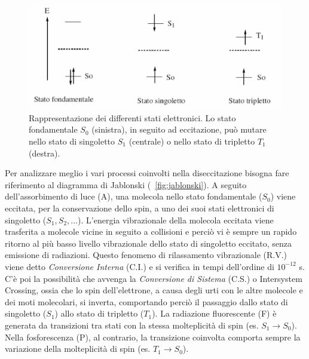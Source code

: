 \begin{figure}
 \centering
\includegraphics[scale=.40]{img/CAP1spin.png}
 \caption{\small{ Rappresentazione dei differenti stati elettronici. Lo stato fondamentale $S_0$ (sinistra), in seguito ad
eccitazione, può mutare nello stato di singoletto $S_1$ (centrale) o nello stato di tripletto $T_1$ (destra). }}
 \label{fig:spin}
\end{figure}

Per analizzare meglio i vari processi coinvolti nella diseccitazione bisogna fare riferimento al diagramma di Jablonski (\figurename~\ref{fig:jablonski}).
A seguito dell'assorbimento di luce (A), una molecola nello stato fondamentale ($S_0$) viene eccitata, per la conservazione dello spin, a uno dei suoi stati elettronici di singoletto ($S_1, S_2,\ldots$). 
L'energia vibrazionale della molecola eccitata viene trasferita a molecole vicine in seguito a collisioni e perciò vi è sempre un rapido ritorno al più basso livello vibrazionale dello stato di singoletto eccitato, senza emissione di radiazioni.
Questo fenomeno di rilassamento vibrazionale (R.V.) viene detto \textit{Conversione Interna} (C.I.) e si verifica in tempi dell'ordine di $10^{-12}$ s. 
C'è poi la possibilità che avvenga la \textit{Conversione di Sistema} (C.S.) o Intersystem Crossing, ossia che lo spin dell'elettrone, a causa degli urti con le altre molecole e dei moti molecolari, si inverta, comportando perciò il passaggio dallo stato di singoletto ($S_1$) allo stato di tripletto ($T_1$). 
La radiazione fluorescente (F) è generata da transizioni tra stati con la stessa molteplicità di spin (es. $S_1 \to S_0$). 
Nella fosforescenza (P), al contrario, la transizione coinvolta comporta sempre la variazione della molteplicità di spin (es. $T_1 \to S_0$).

